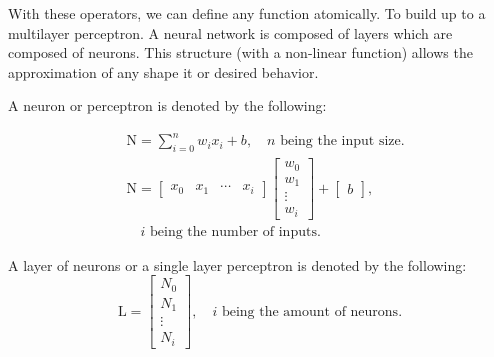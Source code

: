 With these operators, we can define any function atomically. To build up to
a multilayer perceptron. A neural network is composed of layers which are composed of neurons. 
This structure (with a non-linear function) allows the approximation of any shape it or desired behavior. 

\begin{definition}[Neuron]
    A neuron or perceptron is denoted by the following:

    \begin{align*}
        & \text{N} = \sum_{i=0}^{n} w_i x_i + b , \quad n \text{ being the input size.} \\
        & \text{N} = 
         \begin{bmatrix}
            x_0 & x_1 & \cdots & x_i 
        \end{bmatrix}
        \begin{bmatrix}
            w_0 \\
            w_1 \\
            \vdots \\
            w_i
        \end{bmatrix}
            +
        \begin{bmatrix}
            b
        \end{bmatrix}, \\ 
        & \quad i \text{ being the number of inputs.}
    \end{align*}
\end{definition}

\begin{definition}[Layer]
    A layer of neurons or a single layer perceptron is denoted by the following:
    \begin{equation}
        \text{L} = 
        \begin{bmatrix}
        N_0 \\
        N_1 \\
        \vdots \\
        N_i    
        \end{bmatrix}, \quad i \text{ being the amount of neurons.}
    \end{equation}
\end{definition}

